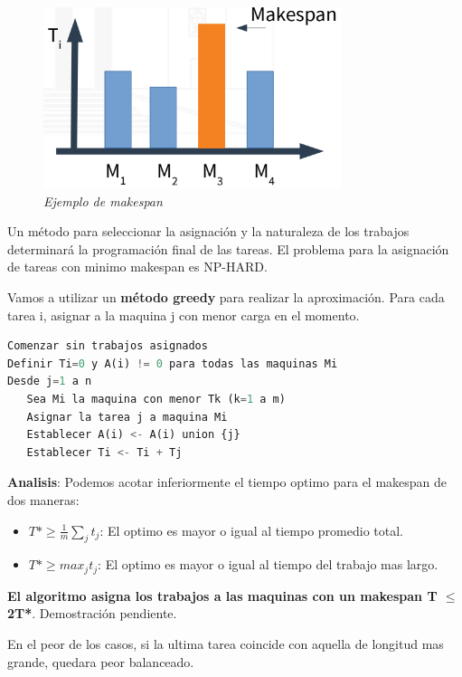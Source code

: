 \documentclass{article}
\begin{document}
\begin{figure}[h!]
    \begin{center} 
    \includegraphics[scale=0.4]{imagenes/grafico-makespan.png}
    \caption{\small \sl Ejemplo de makespan} 
    \end{center}
\end{figure}

Un método para seleccionar la asignación y la naturaleza de los trabajos determinará
la programación final de las tareas. El problema para la asignación de tareas con minimo makespan 
es NP-HARD.

Vamos a utilizar un \textbf{método greedy} para realizar la aproximación. Para cada tarea i, asignar a la maquina j
con menor carga en el momento.

\begin{lstlisting}[language=Python, caption=Algoritmo de aproximación greedy]
Comenzar sin trabajos asignados
Definir Ti=0 y A(i) != 0 para todas las maquinas Mi
Desde j=1 a n
   Sea Mi la maquina con menor Tk (k=1 a m)
   Asignar la tarea j a maquina Mi
   Establecer A(i) <- A(i) union {j}
   Establecer Ti <- Ti + Tj

\end{lstlisting}    

\textbf{Analisis}: Podemos acotar inferiormente el tiempo optimo para el makespan de dos maneras:

\begin{itemize}
    \item \(T* \geq \frac{1}{m}\sum_{j}t_j\): El optimo es mayor o igual al tiempo promedio total.
    \item \(T* \geq max_j t_j\): El optimo es mayor o igual al tiempo del trabajo mas largo.
\end{itemize}

\textbf{El algoritmo asigna los trabajos a las maquinas con un makespan T \(\leq\) 2T*}. Demostración pendiente.

En el peor de los casos, si la ultima tarea coincide con aquella de longitud mas grande, quedara
peor balanceado.
\end{document}
